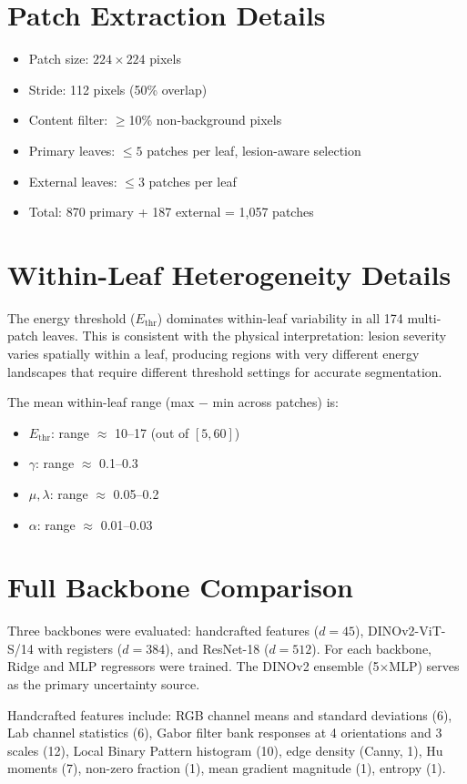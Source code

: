 \documentclass[11pt,a4paper]{article}
\begin{document}
\section{Patch Extraction Details}
\label{app:extraction}

\begin{itemize}[leftmargin=*,itemsep=2pt]
\item Patch size: $224 \times 224$ pixels
\item Stride: 112 pixels (50\% overlap)
\item Content filter: $\geq$10\% non-background pixels
\item Primary leaves: $\leq 5$ patches per leaf, lesion-aware selection
\item External leaves: $\leq 3$ patches per leaf
\item Total: 870 primary + 187 external = 1{,}057 patches
\end{itemize}

\section{Within-Leaf Heterogeneity Details}
\label{app:heterogeneity}

The energy threshold ($E_\text{thr}$) dominates within-leaf variability
in all 174 multi-patch leaves. This is consistent with the
physical interpretation: lesion severity varies spatially within a leaf,
producing regions with very different energy landscapes that require
different threshold settings for accurate segmentation.

The mean within-leaf range (max $-$ min across patches) is:
\begin{itemize}[leftmargin=*,itemsep=1pt]
\item $E_\text{thr}$: range $\approx$ 10--17 (out of $[5, 60]$)
\item $\gamma$: range $\approx$ 0.1--0.3
\item $\mu, \lambda$: range $\approx$ 0.05--0.2
\item $\alpha$: range $\approx$ 0.01--0.03
\end{itemize}

\section{Full Backbone Comparison}
\label{app:backbone}

Three backbones were evaluated: handcrafted features ($d{=}45$),
DINOv2-ViT-S/14 with registers ($d{=}384$), and ResNet-18 ($d{=}512$).
For each backbone, Ridge and MLP regressors were trained.
The DINOv2 ensemble (5$\times$MLP) serves as the primary uncertainty source.

Handcrafted features include:
RGB channel means and standard deviations (6),
Lab channel statistics (6),
Gabor filter bank responses at 4 orientations and 3 scales (12),
Local Binary Pattern histogram (10),
edge density (Canny, 1),
Hu moments (7),
non-zero fraction (1),
mean gradient magnitude (1),
entropy (1).
\end{document}
